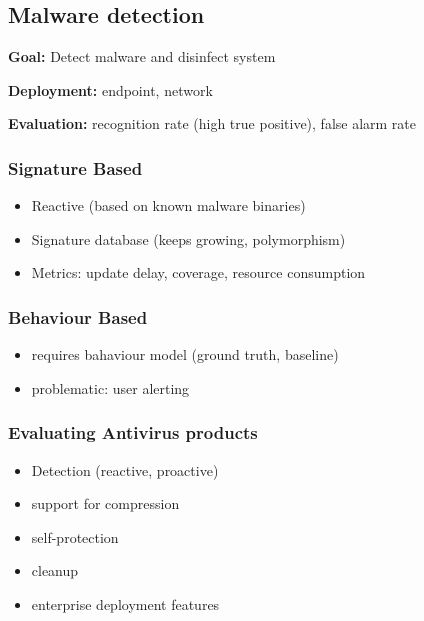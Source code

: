 \documentclass[fs, footer]{latex4ei}
\begin{document}
\begin{multicols*}{4}
{  \subsection{Malware detection}

  \textbf{Goal:} Detect malware and disinfect system

  \textbf{Deployment:} endpoint, network

  \textbf{Evaluation:} recognition rate (high true positive), false alarm rate


  \subsubsection{Signature Based}
  \begin{itemize}
   	\item Reactive (based on known malware binaries)
   	\item Signature database (keeps growing, polymorphism)
   	\item Metrics: update delay, coverage, resource consumption
   \end{itemize}

     \subsubsection{Behaviour Based}
  \begin{itemize}
   	\item requires bahaviour model (ground truth, baseline)
   	\item problematic: user alerting
   \end{itemize}

   \subsubsection{Evaluating Antivirus products}

   \begin{itemize}
    	\item Detection (reactive, proactive)
    	\item support for compression
    	\item self-protection
    	\item cleanup
    	\item enterprise deployment features
    \end{itemize}
}  \sectionbox{
}
\end{multicols*}
\end{document}

